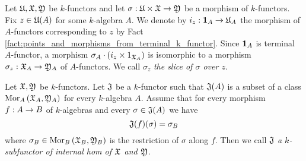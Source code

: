 \begin{definition}
Let ${\mathfrak U},{\mathfrak X},{\mathfrak Y}$ be $k$-functors and let $\sigma:{\mathfrak U}\times {\mathfrak X}\rightarrow {\mathfrak Y}$ be a morphism of $k$-functors. Fix $z\in {\mathfrak U}(A)$ for some $k$-algebra $A$. We denote by $i_z:\mathbf{1}_A\rightarrow {\mathfrak U}_A$ the morphism of $A$-functors corresponding to $z$ by Fact \ref{fact:points_and_morphisms_from_terminal_k_functor}. Since $\mathbf{1}_A$ is terminal $A$-functor, a morphism $\sigma_A\cdot \left(i_z\times 1_{{\mathfrak X}_A}\right)$ is isomorphic to a morphism $\sigma_z:{\mathfrak X}_A\rightarrow {\mathfrak Y}_A$ of $A$-functors. We call $\sigma_z$ \textit{the slice of $\sigma$ over $z$}.
\end{definition}

\begin{definition}
Let ${\mathfrak X}, {\mathfrak Y}$ be $k$-functors. Let ${\mathfrak J}$ be a $k$-functor such that ${\mathfrak J}(A)$ is a subset of a class $\mathrm{Mor}_A\left({\mathfrak X}_A,{\mathfrak Y}_A\right)$ for every $k$-algebra $A$. Assume that for every morphism $f:A\rightarrow B$ of $k$-algebras and every $\sigma\in {\mathfrak J}(A)$ we have
$${\mathfrak J}(f)(\sigma) = \sigma_B$$
where $\sigma_B\in \mathrm{Mor}_B\left({\mathfrak X}_B,{\mathfrak Y}_B\right)$ is the restriction of $\sigma$ along $f$. Then we call ${\mathfrak J}$ \textit{a $k$-subfunctor of internal hom of ${\mathfrak X}$ and ${\mathfrak Y}$}.
\end{definition}

